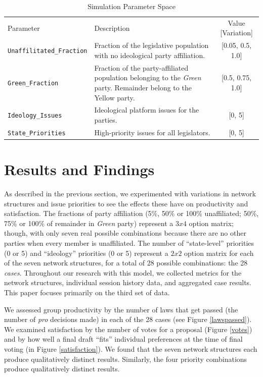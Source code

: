 \documentclass[pdftex,12pt]{llncs}
\begin{document}
\begin{table}
 \caption{Simulation Parameter Space}
 \begin{tabular}{lp{2.25in}c}
 \hline\noalign{\smallskip}
 Parameter & Description & Value [Variation] \\
 \noalign{\smallskip}
 \hline
 \noalign{\smallskip}
 \texttt{Unaffilitated\_Fraction} & Fraction of the legislative population with no ideological party  affiliation. & [0.05, 0.5, 1.0] \\
 \texttt{Green\_Fraction} & Fraction of the party-affiliated population belonging to the \textit{Green} party. Remainder belong to the Yellow party. & [0.5, 0.75, 1.0] \\
 \texttt{Ideology\_Issues} & Ideological platform issues for the parties. & [0, 5] \\
 \texttt{State\_Priorities} & High-priority issues for all legislators. & [0, 5] \\
 \hline
 \end{tabular}
 \label{params}
\end{table}


\section{Results and Findings}
%
As described in the previous section, we experimented with variations in network structures and issue priorities to see the effects these have on productivity and satisfaction.
The fractions of party affiliation (5\%, 50\% or 100\% unaffiliated; 50\%, 75\% or 100\% of remainder in \textit{Green} party) represent a $3 x 4$ option matrix; though, with only seven real possible combinations because there are no other parties when every member is unaffiliated. 
The number of ``state-level'' priorities (0 or 5) and ``ideology'' priorities (0 or 5) represent a $2 x 2$ option matrix for each of the seven network structures, for a total of 28 possible combinations: the 28 \textit{cases}.
Throughout our research with this model, we collected metrics for the network structures, individual session history data, and aggregated case results.
This paper focuses primarily on the third set of data. 

We assessed group productivity by the number of laws that get passed (the number of \textit{pro} decisions made) in each of the 28 cases (see Figure \ref{lawspassed}). 
We examined satisfaction by the number of votes for a proposal (Figure \ref{votes}) and by how well a final draft ``fits'' individual preferences at the time of final voting (in Figure \ref{satisfaction}). 
We found that the seven network structures each produce qualitatively distinct results.
Similarly, the four priority combinations produce qualitatively distinct results. 
\end{document}
